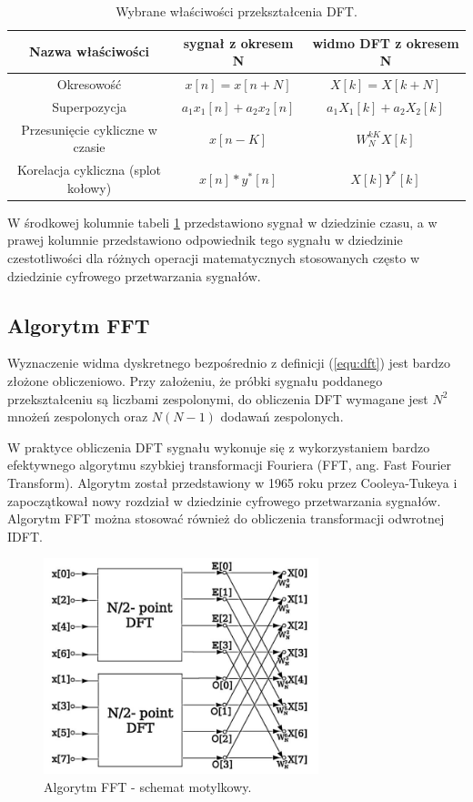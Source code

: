 \begin{table}[H]
	\caption{Wybrane właściwości przekształcenia DFT.}
	\centering
	\label{tab:dft_wlasc}
	\begin{tabular}{|c|c|c|}
		\hline 
		\textbf{Nazwa właściwości} & \textbf{sygnał z okresem N} & \textbf{widmo DFT z okresem N} 	\\
		\hline
		Okresowość					& $x[n] = x[n + N]$ 				& $X[k] = X[k + N]$ 				\\	\hline
		Superpozycja			& $a_{1}x_{1}[n] + a_{2}x_{2}[n]$			& $a_{1}X_{1}[k] + a_{2}X_{2}[k]$			\\	\hline
		Przesunięcie cykliczne w czasie			& $x[n-K]$			& $ W_{N}^{kK}X[k]$			\\	\hline
		Korelacja cykliczna (splot kołowy)		 				& $x[n]*y^{*}[n]$			& $X[k]Y^{*}[k]$			\\ 	\hline
	\end{tabular}
\end{table}
W środkowej kolumnie tabeli \ref{tab:dft_wlasc} przedstawiono sygnał w dziedzinie czasu, a w prawej kolumnie przedstawiono odpowiednik tego sygnału w dziedzinie czestotliwości dla różnych operacji matematycznych stosowanych często w dziedzinie cyfrowego przetwarzania sygnałów.

\subsection{Algorytm FFT}
Wyznaczenie widma dyskretnego bezpośrednio z definicji (\ref{equ:dft}) jest bardzo złożone obliczeniowo. Przy założeniu, że próbki sygnału poddanego przekształceniu są liczbami zespolonymi, do obliczenia DFT wymagane jest $N^{2}$ mnożeń zespolonych oraz $N(N-1)$ dodawań zespolonych.

W praktyce obliczenia DFT sygnału wykonuje się z wykorzystaniem bardzo efektywnego algorytmu szybkiej transformacji Fouriera (FFT, ang. Fast Fourier Transform). Algorytm został przedstawiony w 1965 roku przez Cooleya-Tukeya i zapoczątkował nowy rozdział w dziedzinie cyfrowego przetwarzania sygnałów. Algorytm FFT można stosować również do obliczenia transformacji odwrotnej IDFT.

\begin{figure}[H]
	\centering
	\includegraphics[width=8cm]{./grafiki/fft_motylki}
	\captionsetup{justification=centering}
	\caption{Algorytm FFT - schemat motylkowy.}
	\label{rys:fft_motyl}
\end{figure}

